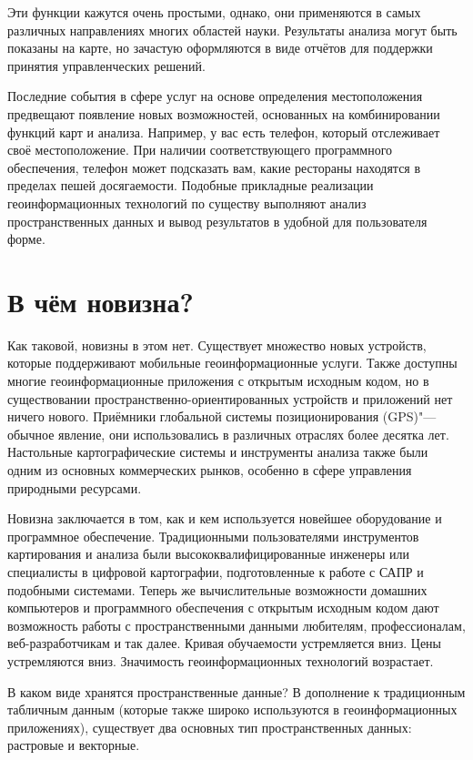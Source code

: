 Эти функции кажутся очень простыми, однако, они применяются в самых
различных направлениях многих областей науки. Результаты анализа могут
быть показаны на карте, но зачастую оформляются в виде отчётов для
поддержки принятия управленческих решений.

Последние события в сфере услуг на основе определения местоположения
предвещают появление новых возможностей, основанных на комбинировании
функций карт и анализа. Например, у вас есть телефон, который
отслеживает своё местоположение. При наличии соответствующего
программного обеспечения, телефон может подсказать вам, какие
рестораны находятся в пределах пешей досягаемости. Подобные
прикладные реализации геоинформационных технологий по существу выполняют
анализ пространственных данных и вывод результатов в удобной для пользователя
форме.

\section{В чём новизна?}\label{label_whynew}

Как таковой, новизны в этом нет. Существует множество новых устройств, которые
поддерживают мобильные геоинформационные услуги. Также доступны многие
геоинформационные приложения с открытым исходным кодом, но в
существовании пространственно-ориентированных устройств и приложений нет
ничего нового. Приёмники глобальной системы позиционирования (GPS)"--- обычное
явление, они использовались в различных отраслях более десятка лет.
Настольные картографические системы и инструменты анализа также были одним из
основных коммерческих рынков, особенно в сфере управления природными ресурсами.

Новизна заключается в том, как и кем используется новейшее оборудование и
программное обеспечение. Традиционными пользователями инструментов
картирования и анализа были высококвалифицированные инженеры или
специалисты в цифровой картографии, подготовленные к работе с
САПР и подобными системами. Теперь же вычислительные возможности
домашних компьютеров и программного обеспечения с открытым исходным
кодом дают возможность работы с пространственными данными любителям, профессионалам,
веб-разработчикам и так далее. Кривая обучаемости устремляется вниз. Цены
устремляются вниз. Значимость геоинформационных технологий возрастает.

В каком виде хранятся пространственные данные? В дополнение к традиционным
табличным данным (которые также широко используются в геоинформационных
приложениях), существует два основных тип пространственных данных: растровые и
векторные.

